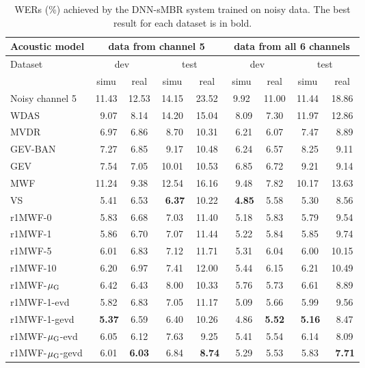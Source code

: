 \documentclass[review]{elsarticle}
\newif\ifproofread
\newcommand{\pfmarker}[1]{%
\ifproofread
\textcolor{red}{#1}%
\else
#1%
\fi
}
\begin{document}
\begin{table*}[!th]
\caption{WERs (\%) achieved by the DNN-sMBR system trained on noisy data. The best result for each dataset is in bold.}
\label{table2}
\begin{center}
\begin{tabular}{|l|c|c|c|c||c|c|c|c|}
  \hline
Acoustic model  & \multicolumn{4}{c||}{\pfmarker{data from channel 5}} & \multicolumn{4}{c|}{\pfmarker{ data from all 6 channels}}\\ \hline
\multirow{2}{*}{Dataset}  & \multicolumn{2}{c|}{dev} & \multicolumn{2}{c||}{test} & \multicolumn{2}{c|}{dev} & \multicolumn{2}{c|}{test} \\ \cline{2-9}
       & simu & real      & simu  & real       & simu & real       & simu  & real \\ \hline \hline
Noisy channel 5  & 11.43& 12.53  & 14.15 &23.52   & 9.92& 11.00 &	11.44 & 18.86	\\ \hline
WDAS  &	~9.07 &	8.14	&	14.20 &	15.04	&	~8.09 &	7.30	&	11.97 &	12.86	\\ \hline
MVDR	       &	~6.97 &	6.86	&	~8.70 &	10.31	&	~6.21 &	6.07	&	~7.47 &	~8.89	\\ \hline
GEV-BAN	       &	~7.27 &	6.85	&	~9.17 &	10.48	&	~6.24 &	6.57	&	~8.25 &	~9.11	\\ \hline
GEV	           &	~7.54 &	7.05	&	10.01 &	10.53	&	~6.85 &	6.72	&	~9.21 &	~9.14	\\ \hline
MWF	           &	11.24 &	9.38	&	12.54 &	16.16	&	~9.48 &	7.82	&	10.17 &	13.63	\\ \hline
VS	           &	~5.41 &	6.53   &\bf ~6.37 &10.22   &\bf~4.85 &	5.58	& ~5.30 &~8.56	\\ \hline \hline

r1MWF-0	       &	~5.83 &	6.68	&	~7.03 &	11.40	&	~5.18 &	5.83	&	~5.79 &	~9.54	\\ \hline
r1MWF-1	       &	~5.86 &	6.70	&	~7.07 &	11.44	&	~5.22 &	5.84	&	~5.85 &	~9.74	\\ \hline
r1MWF-5	       &	~6.01 &	6.83	&	~7.12 &	11.71	&	~5.31 &	6.04	&	~6.00 &	10.15	\\ \hline
r1MWF-10	   &	~6.20 &	6.97	&	~7.41 &	12.00	&	~5.44 &	6.15	&	~6.21 &	10.49	\\ \hline
r1MWF-$\mu_{\text G}$ &	~6.42 &	6.43	&	~8.00 &	10.33	&	~5.76 &	5.73	&	~6.61 &	~8.89	\\ \hline \hline

r1MWF-1-evd	   &	~5.82 &	6.83	&	~7.05 &	11.17	&	~5.09 &	5.66	&	~5.99 &	~9.56	\\ \hline
r1MWF-1-gevd	&\bf ~5.37 & 6.59  & ~6.40 &	10.26  & ~4.86 &\bf 5.52	&\bf ~5.16 & ~8.47	\\ \hline
r1MWF-$\mu_{\text G}$-evd	&	~6.05 &	6.12 &	~7.63 & ~9.25 &	~5.41 &	5.54	&	~6.14 & ~8.09	\\ \hline
r1MWF-$\mu_{\text G}$-gevd	&	~6.01 &\bf 6.03	&	~6.84 &\bf ~8.74 &	~5.29 & 5.53	&	~5.83 &\bf ~7.71	\\ \hline

\end{tabular}
\end{center}
\end{table*}
\end{document}
